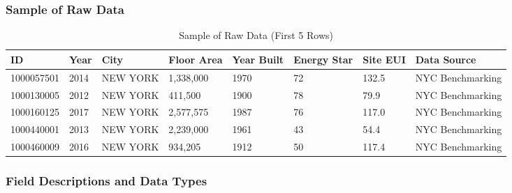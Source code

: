 \subsubsection{Sample of Raw Data}

\begin{table}[h]
\centering
\caption{Sample of Raw Data (First 5 Rows)}
\begin{tabular}{|l|l|l|l|l|l|l|l|}
\hline
\textbf{ID} & \textbf{Year} & \textbf{City} & \textbf{Floor Area} & \textbf{Year Built} & \textbf{Energy Star} & \textbf{Site EUI} & \textbf{Data Source} \\
\hline
1000057501 & 2014 & NEW YORK & 1,338,000 & 1970 & 72 & 132.5 & NYC Benchmarking \\
\hline
1000130005 & 2012 & NEW YORK & 411,500 & 1900 & 78 & 79.9 & NYC Benchmarking \\
\hline
1000160125 & 2017 & NEW YORK & 2,577,575 & 1987 & 76 & 117.0 & NYC Benchmarking \\
\hline
1000440001 & 2013 & NEW YORK & 2,239,000 & 1961 & 43 & 54.4 & NYC Benchmarking \\
\hline
1000460009 & 2016 & NEW YORK & 934,205 & 1912 & 50 & 117.4 & NYC Benchmarking \\
\hline
\end{tabular}
\end{table}

\subsubsection{Field Descriptions and Data Types}

